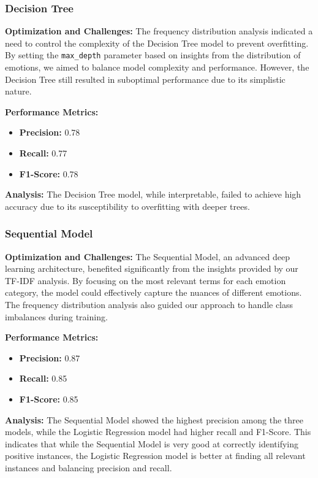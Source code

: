 \subsubsection{Decision Tree}
\textbf{Optimization and Challenges:} The frequency distribution analysis indicated a need to control the complexity of the Decision Tree model to prevent overfitting. By setting the \texttt{max\_depth} parameter based on insights from the distribution of emotions, we aimed to balance model complexity and performance. However, the Decision Tree still resulted in suboptimal performance due to its simplistic nature.

\textbf{Performance Metrics:}
\begin{itemize}
  \item \textbf{Precision:} 0.78
  \item \textbf{Recall:} 0.77
  \item \textbf{F1-Score:} 0.78
\end{itemize}

\textbf{Analysis:} The Decision Tree model, while interpretable, failed to achieve high accuracy due to its susceptibility to overfitting with deeper trees.

\subsubsection{Sequential Model}
\textbf{Optimization and Challenges:} The Sequential Model, an advanced deep learning architecture, benefited significantly from the insights provided by our TF-IDF analysis. By focusing on the most relevant terms for each emotion category, the model could effectively capture the nuances of different emotions. The frequency distribution analysis also guided our approach to handle class imbalances during training.

\textbf{Performance Metrics:}
\begin{itemize}
  \item \textbf{Precision:} 0.87
  \item \textbf{Recall:} 0.85
  \item \textbf{F1-Score:} 0.85
\end{itemize}

\textbf{Analysis:} The Sequential Model showed the highest precision among the three models, while the Logistic Regression model had higher recall and F1-Score. This indicates that while the Sequential Model is very good at correctly identifying positive instances, the Logistic Regression model is better at finding all relevant instances and balancing precision and recall.

